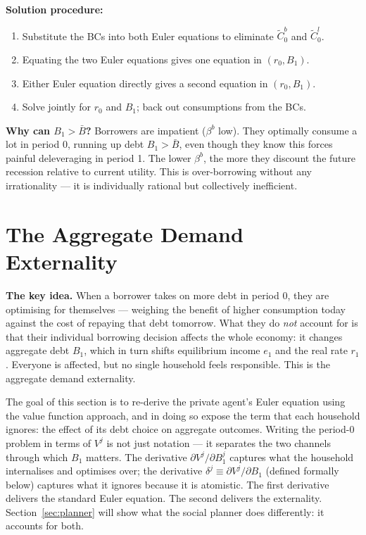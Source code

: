 \documentclass[11pt,a4paper]{article}
\begin{document}
\textbf{Solution procedure:}
\begin{enumerate}
    \item Substitute the BCs into both Euler equations to eliminate $\tilde{C}_0^b$ and $\tilde{C}_0^l$.
    \item Equating the two Euler equations gives one equation in $(r_0, B_1)$.
    \item Either Euler equation directly gives a second equation in $(r_0, B_1)$.
    \item Solve jointly for $r_0$ and $B_1$; back out consumptions from the BCs.
\end{enumerate}

\textbf{Why can $B_1 > \bar{B}$?} Borrowers are impatient ($\beta^b$ low). They optimally consume a lot in period 0, running up debt $B_1 > \bar{B}$, even though they know this forces painful deleveraging in period 1. The lower $\beta^b$, the more they discount the future recession relative to current utility. This is over-borrowing without any irrationality --- it is individually rational but collectively inefficient.

\section{The Aggregate Demand Externality}\label{sec:ade}

\textbf{The key idea.} When a borrower takes on more debt in period 0, they are optimising for themselves --- weighing the benefit of higher consumption today against the cost of repaying that debt tomorrow. What they do \textit{not} account for is that their individual borrowing decision affects the whole economy: it changes aggregate debt $B_1$, which in turn shifts equilibrium income $e_1$ and the real rate $r_1$. Everyone is affected, but no single household feels responsible. This is the aggregate demand externality.

The goal of this section is to re-derive the private agent's Euler equation using the value function approach, and in doing so expose the term that each household ignores: the effect of its debt choice on aggregate outcomes. Writing the period-0 problem in terms of $V^j$ is not just notation --- it separates the two channels through which $B_1$ matters. The derivative $\partial V^j/\partial B_1^j$ captures what the household internalises and optimises over; the derivative $\delta^j \equiv \partial V^j/\partial B_1$ (defined formally below) captures what it ignores because it is atomistic. The first derivative delivers the standard Euler equation. The second delivers the externality. Section~\ref{sec:planner} will show what the social planner does differently: it accounts for both.
\end{document}

